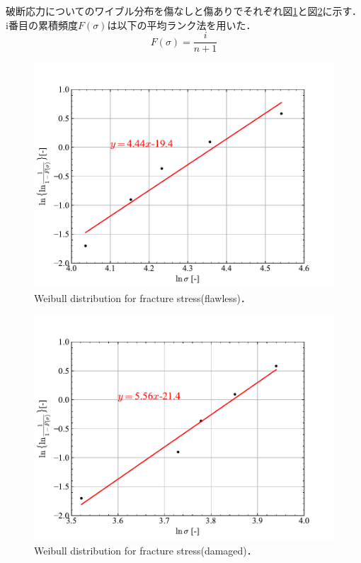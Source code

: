 破断応力についてのワイブル分布を傷なしと傷ありでそれぞれ図\ref{fig:ワイブル分布(傷なし)}と図\ref{fig:ワイブル分布(傷あり)}に示す．i番目の累積頻度$F(\sigma)$は以下の平均ランク法を用いた．
\begin{equation}
    F(\sigma) = \frac{i}{n+1}
    \label{eq:平均ランク法}
\end{equation}
\begin{figure}[htbp]
    \centering %
    \includegraphics[width=100truemm,clip]{fig/fig_Weibull1.pdf}
    \caption{Weibull distribution for fracture stress(flawless)．}
    \label{fig:ワイブル分布(傷なし)}
\end{figure}
\begin{figure}[htbp]
    \centering %
    \includegraphics[width=100truemm,clip]{fig/fig_Weibull2.pdf}
    \caption{Weibull distribution for fracture stress(damaged)．}
    \label{fig:ワイブル分布(傷あり)}
\end{figure}
